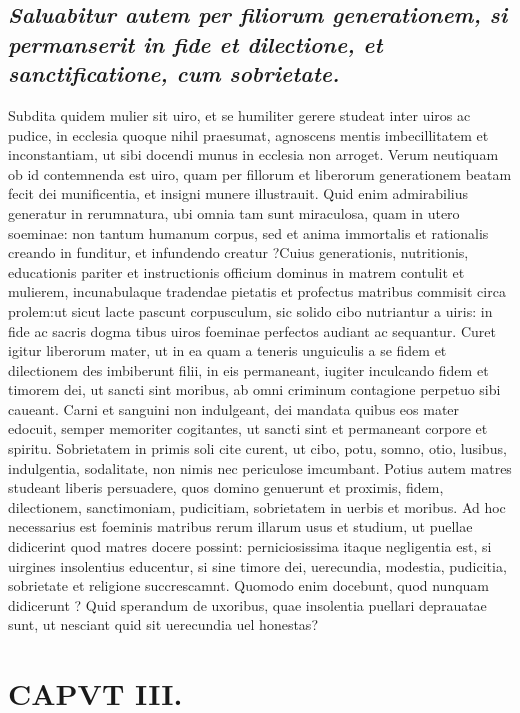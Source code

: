 \documentclass{article}
\begin{document}
\begin{pages}
\subsection*{\textit{Saluabitur autem per filiorum generationem, si permanserit in fide et dilectione, et sanctificatione, cum sobrietate. }}\pstart Subdita quidem mulier sit uiro, et se humiliter gerere studeat inter uiros ac pudice, in ecclesia quoque nihil praesumat, agnoscens mentis imbecillitatem et inconstantiam, ut sibi docendi munus in ecclesia non arroget. Verum neutiquam ob id contemnenda est uiro, quam per fillorum et liberorum generationem beatam fecit dei munificentia, et insigni munere illustrauit. Quid enim admirabilius generatur in rerumnatura, ubi omnia tam sunt miraculosa, quam in utero soeminae: non tantum humanum corpus, sed et anima immortalis et rationalis creando in funditur, et infundendo creatur ?Cuius generationis, nutritionis, educationis pariter et instructionis officium dominus in matrem contulit et mulierem, incunabulaque tradendae pietatis et profectus matribus commisit circa prolem:ut sicut lacte pascunt corpusculum, sic solido cibo nutriantur a uiris: in fide ac sacris dogma tibus uiros foeminae perfectos audiant ac sequantur. Curet igitur liberorum mater, ut in ea quam a teneris unguiculis a se fidem et dilectionem des imbiberunt filii, in eis permaneant, iugiter inculcando fidem et timorem dei, ut sancti sint moribus, ab omni criminum contagione perpetuo sibi caueant. Carni et sanguini non indulgeant, dei mandata quibus eos mater edocuit, semper memoriter cogitantes, ut sancti sint et permaneant corpore et spiritu. Sobrietatem in primis soli cite curent, ut cibo, potu, somno, otio, lusibus, indulgentia, sodalitate, non nimis nec periculose imcumbant. Potius autem matres studeant liberis persuadere, quos domino genuerunt et proximis, fidem, dilectionem, sanctimoniam, pudicitiam, sobrietatem in uerbis et moribus. Ad hoc necessarius est foeminis matribus rerum illarum usus et studium, ut puellae didicerint quod matres docere possint: perniciosissima itaque negligentia est, si uirgines insolentius educentur, si sine timore dei, uerecundia, modestia, pudicitia, sobrietate et religione succrescamnt. Quomodo enim docebunt, quod nunquam didicerunt ? Quid sperandum de uxoribus, quae insolentia puellari deprauatae sunt, ut nesciant quid sit uerecundia uel honestas?  \pend
\endnumbering\beginnumbering\section{CAPVT III.}
{}

\end{pages}
\end{document}
